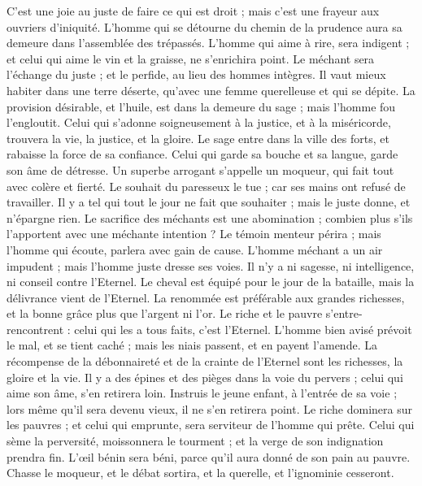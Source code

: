 \begin{multicols}{2}
C'est une joie au juste de faire ce qui est droit ; mais c'est une frayeur aux ouvriers d'iniquité.
L'homme qui se détourne du chemin de la prudence aura sa demeure dans l'assemblée des trépassés.
L'homme qui aime à rire, sera indigent ; et celui qui aime le vin et la graisse, ne s'enrichira point.
Le méchant sera l'échange du juste ; et le perfide, au lieu des hommes intègres.
Il vaut mieux habiter dans une terre déserte, qu'avec une femme querelleuse et qui se dépite.
La provision désirable, et l'huile, est dans la demeure du sage ; mais l'homme fou l'engloutit.
Celui qui s'adonne soigneusement à la justice, et à la miséricorde, trouvera la vie, la justice, et la gloire.
Le sage entre dans la ville des forts, et rabaisse la force de sa confiance.
Celui qui garde sa bouche et sa langue, garde son âme de détresse.
Un superbe arrogant s'appelle un moqueur, qui fait tout avec colère et fierté.
Le souhait du paresseux le tue ; car ses mains ont refusé de travailler.
Il y a tel qui tout le jour ne fait que souhaiter ; mais le juste donne, et n'épargne rien.
Le sacrifice des méchants est une abomination ; combien plus s'ils l'apportent avec une méchante intention ?
Le témoin menteur périra ; mais l'homme qui écoute, parlera avec gain de cause.
L'homme méchant a un air impudent ; mais l'homme juste dresse ses voies.
Il n'y a ni sagesse, ni intelligence, ni conseil contre l'Eternel.
Le cheval est équipé pour le jour de la bataille, mais la délivrance vient de l'Eternel.
\VerseOne{}La renommée est préférable aux grandes richesses, et la bonne grâce plus que l'argent ni l'or.
Le riche et le pauvre s'entre-rencontrent : celui qui les a tous faits, c'est l'Eternel.
L'homme bien avisé prévoit le mal, et se tient caché ; mais les niais passent, et en payent l'amende.
La récompense de la débonnaireté et de la crainte de l'Eternel sont les richesses, la gloire et la vie.
Il y a des épines et des pièges dans la voie du pervers ; celui qui aime son âme, s'en retirera loin.
Instruis le jeune enfant, à l'entrée de sa voie ; lors même qu'il sera devenu vieux, il ne s'en retirera point.
Le riche dominera sur les pauvres ; et celui qui emprunte, sera serviteur de l'homme qui prête.
Celui qui sème la perversité, moissonnera le tourment ; et la verge de son indignation prendra fin.
L'œil bénin sera béni, parce qu'il aura donné de son pain au pauvre.
Chasse le moqueur, et le débat sortira, et la querelle, et l'ignominie cesseront.

\end{multicols}
